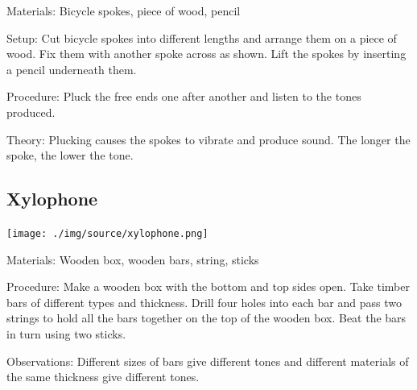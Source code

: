 \begin{multicols}{2}
\begin{description*}
\item[Materials:]{Bicycle spokes, piece of wood, pencil}
\item[Setup:]{Cut bicycle spokes into different lengths and arrange them on a piece of wood. Fix them with another spoke across as shown. Lift the spokes by inserting a pencil underneath them.}
\item[Procedure:]{Pluck the free ends one after another and listen to the tones produced.}
\item[Theory:]{Plucking causes the spokes to vibrate and produce sound. The longer the spoke, the lower the tone.}
\end{description*}

\subsection{Xylophone}

\begin{center}
\texttt{[image: ./img/source/xylophone.png]}
\end{center}

\begin{description*}
\item[Materials:]{Wooden box, wooden bars, string, sticks}
\item[Procedure:]{Make a wooden box with the bottom and top sides open. Take timber bars of different types and thickness. Drill four holes into each bar and pass two strings to hold all the bars together on the top of the wooden box. Beat the bars in turn using two sticks.}
\item[Observations:]{Different sizes of bars give different tones and different materials of the same thickness give different tones.}
\end{description*}


\end{multicols}
